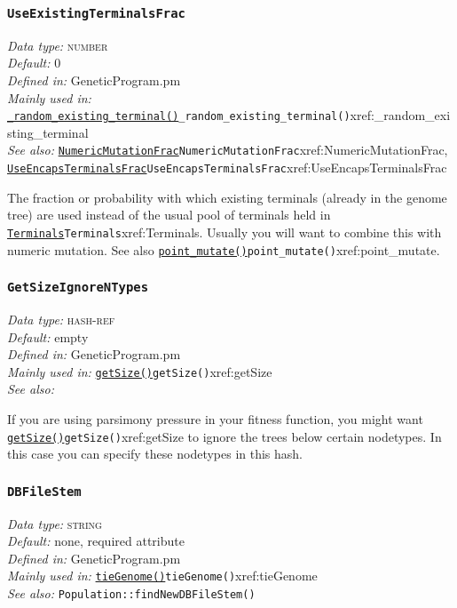 \documentclass[a4paper]{article}
\begin{document}
\subsubsection{\texttt{UseExistingTerminalsFrac}}\label{xref:UseExistingTerminalsFrac}
\begin{flushleft}
\textit{Data type:} \textsc{number}\\
\textit{Default:} 0\\
\textit{Defined in:} GeneticProgram.pm\\
\textit{Mainly used in:} \hyperref[no]{\texttt{\_random\_existing\_terminal()}}{\texttt{\_random\_existing\_terminal()}}{xref:_random_existing_terminal}\\
\textit{See also:} \hyperref[no]{\texttt{NumericMutationFrac}}{\texttt{NumericMutationFrac}}{xref:NumericMutationFrac}, \hyperref[no]{\texttt{UseEncapsTerminalsFrac}}{\texttt{UseEncapsTerminalsFrac}}{xref:UseEncapsTerminalsFrac}
\end{flushleft}

The fraction or probability with which existing terminals (already in
the genome tree) are used instead of the usual pool of terminals held
in \hyperref[no]{\texttt{Terminals}}{\texttt{Terminals}}{xref:Terminals}.  Usually you will want to combine this with
numeric mutation.  See also \hyperref[no]{\texttt{point\_mutate()}}{\texttt{point\_mutate()}}{xref:point_mutate}.

\subsubsection{\texttt{GetSizeIgnoreNTypes}}\label{xref:GetSizeIgnoreNTypes}
\begin{flushleft}
\textit{Data type:} \textsc{hash-ref}\\
\textit{Default:} empty\\
\textit{Defined in:} GeneticProgram.pm\\
\textit{Mainly used in:} \hyperref[no]{\texttt{getSize()}}{\texttt{getSize()}}{xref:getSize}\\
\textit{See also:}
\end{flushleft}

If you are using parsimony pressure in your fitness function, you
might want \hyperref[no]{\texttt{getSize()}}{\texttt{getSize()}}{xref:getSize} to ignore the trees below certain
nodetypes.  In this case you can specify these nodetypes in this hash.

\subsubsection{\texttt{DBFileStem}}\label{xref:DBFileStem}
\begin{flushleft}
\textit{Data type:} \textsc{string}\\
\textit{Default:} none, required attribute\\
\textit{Defined in:} GeneticProgram.pm\\
\textit{Mainly used in:} \hyperref[no]{\texttt{tieGenome()}}{\texttt{tieGenome()}}{xref:tieGenome}\\
\textit{See also:} \texttt{Population::findNewDBFileStem()}
\end{flushleft}
\end{document}
